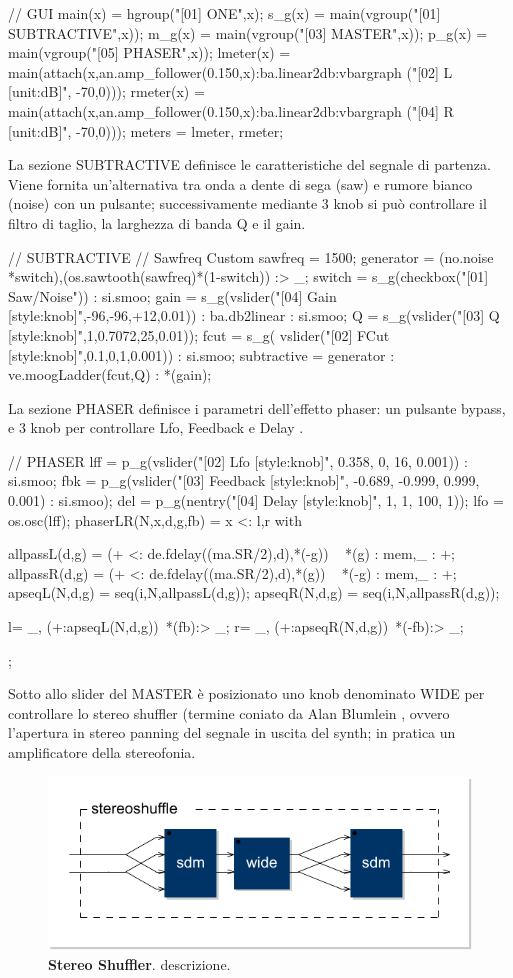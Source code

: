\documentclass[
	a4paper,
	twocolumn
	]{article}
\begin{document}
// GUI
main(x) = hgroup("[01] ONE",x);
s_g(x) = main(vgroup("[01] SUBTRACTIVE",x));
m_g(x) = main(vgroup("[03] MASTER",x));
p_g(x) = main(vgroup("[05] PHASER",x));
lmeter(x) = main(attach(x,an.amp_follower(0.150,x):ba.linear2db:vbargraph
			("[02] L [unit:dB]", -70,0)));
rmeter(x) = main(attach(x,an.amp_follower(0.150,x):ba.linear2db:vbargraph
			("[04] R [unit:dB]", -70,0)));
meters = lmeter, rmeter;

La sezione SUBTRACTIVE definisce le caratteristiche del segnale di partenza.
Viene fornita un'alternativa tra onda a dente di sega (saw) e rumore bianco
(noise) con un pulsante; successivamente mediante 3 knob si può controllare il
filtro di taglio, la larghezza di banda Q e il gain.

// SUBTRACTIVE
// Sawfreq Custom
sawfreq = 1500;
generator = (no.noise *switch),(os.sawtooth(sawfreq)*(1-switch)) :> _;
switch = s_g(checkbox("[01] Saw/Noise")) : si.smoo;
gain = s_g(vslider("[04] Gain [style:knob]",-96,-96,+12,0.01)) : ba.db2linear
			: si.smoo;
Q = s_g(vslider("[03] Q [style:knob]",1,0.7072,25,0.01));
fcut = s_g( vslider("[02] FCut [style:knob]",0.1,0,1,0.001)) : si.smoo;
subtractive = generator : ve.moogLadder(fcut,Q) : *(gain);

La sezione PHASER definisce i parametri dell'effetto phaser: un pulsante bypass,
e 3 knob per controllare Lfo, Feedback e Delay .

// PHASER
lff = p_g(vslider("[02] Lfo [style:knob]", 0.358, 0, 16, 0.001)) : si.smoo;
fbk = p_g(vslider("[03] Feedback [style:knob]", -0.689, -0.999, 0.999, 0.001)
			: si.smoo);
del = p_g(nentry("[04] Delay [style:knob]", 1, 1, 100, 1));
lfo = os.osc(lff);
phaserLR(N,x,d,g,fb) = x <: l,r
with{
  allpassL(d,g) = (+ <: de.fdelay((ma.SR/2),d),*(-g)) ~ *(g) : mem,_ : +;
  allpassR(d,g) = (+ <: de.fdelay((ma.SR/2),d),*(g)) ~ *(-g) : mem,_ : +;
  apseqL(N,d,g) = seq(i,N,allpassL(d,g));
  apseqR(N,d,g) = seq(i,N,allpassR(d,g));

  l= _, (+:apseqL(N,d,g))~*(fb):> _;
  r=  _, (+:apseqR(N,d,g))~*(-fb):> _;
};

Sotto allo slider del MASTER è posizionato uno knob denominato WIDE per
controllare lo stereo shuffler (termine coniato da Alan Blumlein \cite{ab58},
ovvero l'apertura in stereo panning del segnale in uscita del synth; in pratica
un amplificatore della stereofonia.

\begin{figure}[b]%
\begin{center}
\includegraphics[width=.47\textwidth]{img/mid-side-shuffler.pdf}
\caption{\textbf{Stereo Shuffler}. descrizione.}
\label{shuff}
\end{center}
\end{figure}
\end{document}
